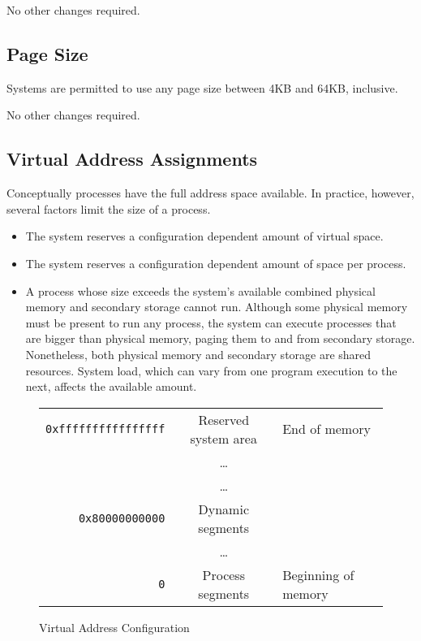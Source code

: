 No other changes required.

\subsection{Page Size}

Systems are permitted to use any page size between 4KB and 64KB,
inclusive.

No other changes required.

\subsection{Virtual Address Assignments}

Conceptually processes have the full address space available.
In practice, however, several factors limit the size of a process.
\begin{itemize}
  \item The system reserves a configuration dependent amount of virtual space.
  \item The system reserves a configuration dependent amount of space per
    process.
  \item
    A process whose size exceeds the system's available combined physical
    memory and secondary storage cannot run. Although some physical memory
    must be present to run any process, the system can execute processes that
    are bigger than physical memory, paging them to and from secondary storage.
    Nonetheless, both physical memory and secondary storage are
    shared resources. System load, which can vary from one program execution
    to the next, affects the available amount.
\end{itemize}

\begin{figure}[H]
\Hrule
  \caption{Virtual Address Configuration}
  \label{fig-address}
  \begin{center}
    \begin{tabular}{r|c|l}
      \noalign{\smallskip}  \cline{2-2}
      \verb|0xffffffffffffffff| & Reserved system area & End of memory\\ 
      & \dots & \\ \cline{2-2}
      & \dots & \\
      \verb|0x80000000000| & Dynamic segments & \\ \cline{2-2}
      & \dots & \\
      \verb|0| & Process segments & Beginning of memory\\ \cline{2-2}
    \end{tabular}
  \end{center}
\Hrule
\end{figure}

